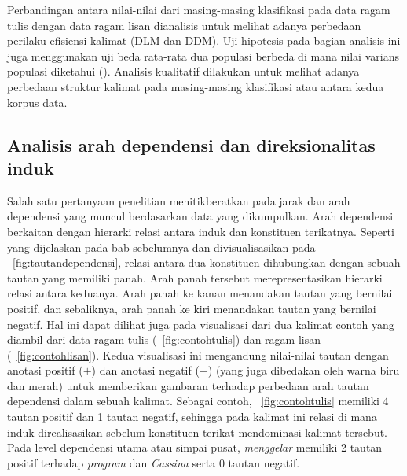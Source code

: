 Perbandingan antara nilai-nilai dari masing-masing klasifikasi pada data ragam tulis dengan data ragam lisan dianalisis untuk melihat adanya perbedaan perilaku efisiensi kalimat (DLM dan DDM). Uji hipotesis pada bagian analisis ini juga menggunakan uji beda rata-rata dua populasi berbeda di mana nilai varians populasi diketahui (). Analisis kualitatif dilakukan untuk melihat adanya perbedaan struktur kalimat pada masing-masing klasifikasi atau antara kedua korpus data.

\subsection{Analisis arah dependensi dan direksionalitas induk}
Salah satu pertanyaan penelitian menitikberatkan pada jarak dan arah dependensi yang muncul berdasarkan data yang dikumpulkan. Arah dependensi berkaitan dengan hierarki relasi antara induk dan konstituen terikatnya. Seperti yang dijelaskan pada bab sebelumnya dan divisualisasikan pada \pic~\ref{fig:tautandependensi}, relasi antara dua konstituen dihubungkan dengan sebuah tautan yang memiliki panah. Arah panah tersebut merepresentasikan hierarki relasi antara keduanya. Arah panah ke kanan menandakan tautan yang bernilai positif, dan sebaliknya, arah panah ke kiri menandakan tautan yang bernilai negatif. Hal ini dapat dilihat juga pada visualisasi dari dua kalimat contoh yang diambil dari data ragam tulis (\pic~\ref{fig:contohtulis}) dan ragam lisan (\pic~\ref{fig:contohlisan}). Kedua visualisasi ini mengandung nilai-nilai tautan dengan anotasi positif ($+$) dan anotasi negatif ($-$) (yang juga dibedakan oleh warna biru dan merah) untuk memberikan gambaran terhadap perbedaan arah tautan dependensi dalam sebuah kalimat. Sebagai contoh, \pic~\ref{fig:contohtulis} memiliki 4 tautan positif dan 1 tautan negatif, sehingga pada kalimat ini relasi di mana induk direalisasikan sebelum konstituen terikat mendominasi kalimat tersebut. Pada level dependensi utama atau simpai pusat, \textit{menggelar} memiliki 2 tautan positif terhadap \textit{program} dan \textit{Cassina} serta 0 tautan negatif.


